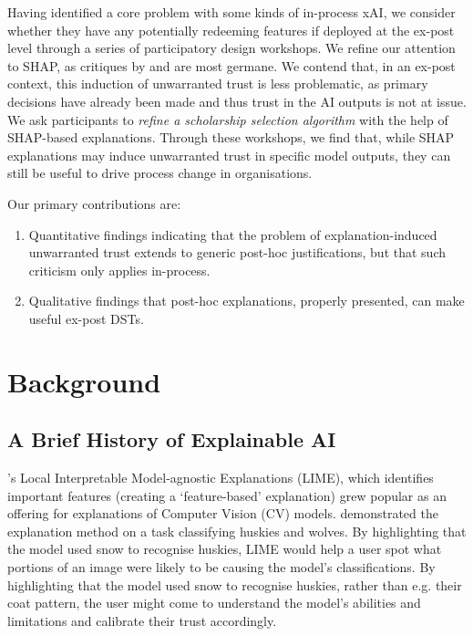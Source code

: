 Having identified a core problem with some kinds of in-process xAI, we consider whether they have any potentially redeeming features if deployed at the ex-post level through a series of participatory design workshops. We refine our attention to SHAP, as critiques by \textcite{Lipton} and \textcite{miller_explainable_2023} are most germane. We contend that, in an ex-post context, this induction of unwarranted trust is less problematic, as primary decisions have already been made and thus trust in the AI outputs is not at issue. We ask participants to \emph{refine a scholarship selection algorithm} with the help of SHAP-based explanations. Through these workshops, we find that, while SHAP explanations may induce unwarranted trust in specific model outputs, they can still be useful to drive process change in organisations.

Our primary contributions are:

\begin{enumerate}
    \item Quantitative findings indicating that the problem of explanation-induced unwarranted trust extends to generic post-hoc justifications, but that such criticism only applies in-process.
    \item Qualitative findings that post-hoc explanations, properly presented, can make useful ex-post DSTs.
\end{enumerate}

\section{Background}
\subsection{A Brief History of Explainable AI}\label{ssec:history}
\textcite{ribeiro_why_2016}'s Local Interpretable Model-agnostic Explanations (LIME), which identifies important features (creating a `feature-based' explanation) grew popular as an offering for explanations of Computer Vision (CV) models. \textcite{ribeiro_why_2016} demonstrated the explanation method on a task classifying huskies and wolves. By highlighting that the model used snow to recognise huskies, LIME would help a user spot what portions of an image were likely to be causing the model's classifications. By highlighting that the model used snow to recognise huskies, rather than e.g. their coat pattern, the user might come to understand the model's abilities and limitations and calibrate their trust accordingly.

